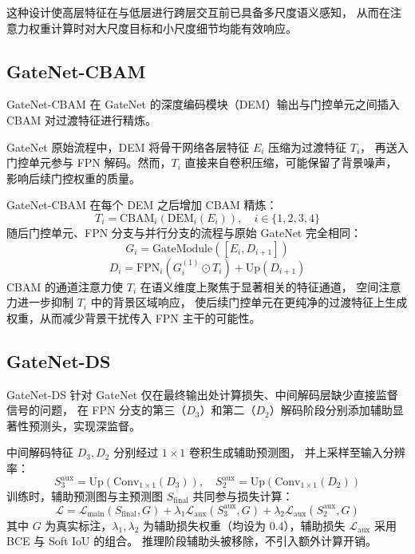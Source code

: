 \documentclass[UTF8,a4paper,10pt]{ctexart}
\begin{document}
这种设计使高层特征在与低层进行跨层交互前已具备多尺度语义感知，
从而在注意力权重计算时对大尺度目标和小尺度细节均能有效响应。

\subsection{GateNet-CBAM}

GateNet-CBAM 在 GateNet 的深度编码模块（DEM）输出与门控单元之间插入 CBAM 对过渡特征进行精炼。

GateNet 原始流程中，DEM 将骨干网络各层特征 $E_i$ 压缩为过渡特征 $T_i$，
再送入门控单元参与 FPN 解码。然而，$T_i$ 直接来自卷积压缩，可能保留了背景噪声，
影响后续门控权重的质量。

GateNet-CBAM 在每个 DEM 之后增加 CBAM 精炼：
\[
T_i = \text{CBAM}_i\!\left(\text{DEM}_i(E_i)\right), \quad i \in \{1,2,3,4\}
\]
随后门控单元、FPN 分支与并行分支的流程与原始 GateNet 完全相同：
\[
G_i = \text{GateModule}\!\left([E_i, D_{i+1}]\right)
\]
\[
D_i = \text{FPN}_i\!\left(G_i^{(1)} \odot T_i\right) + \text{Up}(D_{i+1})
\]
CBAM 的通道注意力使 $T_i$ 在语义维度上聚焦于显著相关的特征通道，
空间注意力进一步抑制 $T_i$ 中的背景区域响应，
使后续门控单元在更纯净的过渡特征上生成权重，从而减少背景干扰传入 FPN 主干的可能性。

\subsection{GateNet-DS}

GateNet-DS 针对 GateNet 仅在最终输出处计算损失、中间解码层缺少直接监督信号的问题，
在 FPN 分支的第三（$D_3$）和第二（$D_2$）解码阶段分别添加辅助显著性预测头，实现深监督。

中间解码特征 $D_3, D_2$ 分别经过 $1\times1$ 卷积生成辅助预测图，
并上采样至输入分辨率：
\[
S_3^{\text{aux}} = \text{Up}\!\left(\text{Conv}_{1\times1}(D_3)\right), \quad
S_2^{\text{aux}} = \text{Up}\!\left(\text{Conv}_{1\times1}(D_2)\right)
\]
训练时，辅助预测图与主预测图 $S_{\text{final}}$ 共同参与损失计算：
\[
\mathcal{L} = \mathcal{L}_{\text{main}}(S_{\text{final}}, G)
+ \lambda_1 \mathcal{L}_{\text{aux}}(S_3^{\text{aux}}, G)
+ \lambda_2 \mathcal{L}_{\text{aux}}(S_2^{\text{aux}}, G)
\]
其中 $G$ 为真实标注，$\lambda_1, \lambda_2$ 为辅助损失权重（均设为 0.4），辅助损失 $\mathcal{L}_{\text{aux}}$ 采用 BCE 与 Soft IoU 的组合。
推理阶段辅助头被移除，不引入额外计算开销。
\end{document}
